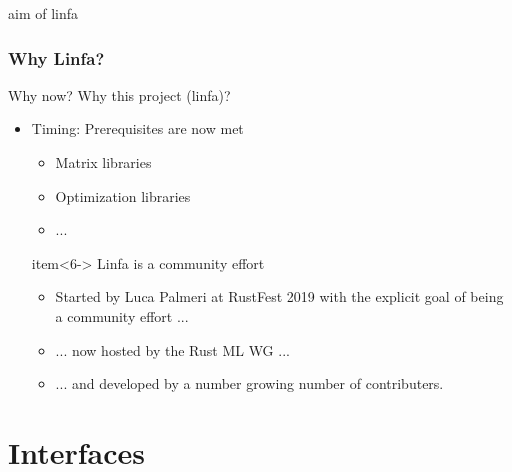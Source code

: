 \documentclass[xcolor=x11names,compress]{beamer}
\begin{document}
\begin{frame}{aim of linfa}
    \frametitle{Why Linfa?}
    Why now? Why this project (linfa)?
    \begin{itemize}
        \item<2-> Timing: Prerequisites are now met
        \begin{itemize}[label=-]
            \item<3->{Matrix libraries}
	    \item<4->{Optimization libraries}
	    \item<5->{...}
        \end{itemize}
	item<6-> Linfa is a community effort
        \begin{itemize}[label=-]
            \item<7->{Started by Luca Palmeri at RustFest 2019 with the explicit goal of being a community effort ...}
	    \item<8->{... now hosted by the Rust ML WG ... }
	    \item<9->{... and developed by a number growing number of contributers.}
        \end{itemize}	
    \end{itemize}
\end{frame}

\section{Interfaces}
\end{document}
